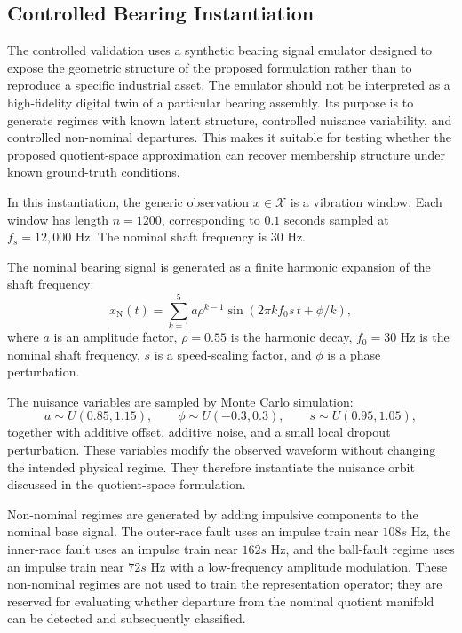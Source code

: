 \documentclass[11pt,letterpaper]{article}
\newcommand{\X}{\ensuremath{\mathcal{X}}}
\begin{document}
\subsection{Controlled Bearing Instantiation}
\label{subsec:bearing_instantiation}
The controlled validation uses a synthetic bearing signal emulator designed to expose the geometric structure of the proposed formulation rather than to reproduce a specific industrial asset.
The emulator should not be interpreted as a high-fidelity digital twin of a particular bearing assembly.
Its purpose is to generate regimes with known latent structure, controlled nuisance variability, and controlled non-nominal departures.
This makes it suitable for testing whether the proposed quotient-space approximation can recover membership structure under known ground-truth conditions.

In this instantiation, the generic observation \(x \in \X\) is a vibration window.
Each window has length \(n=1200\), corresponding to \(0.1\) seconds sampled at \(f_s=12{,}000\) Hz.
The nominal shaft frequency is \(30\) Hz.

The nominal bearing signal is generated as a finite harmonic expansion of the shaft frequency:
\[
x_{\mathrm{N}}(t)
=
\sum_{k=1}^{5}
a \rho^{k-1}
\sin(2\pi k f_0 s\,t + \phi/k),
\]
where \(a\) is an amplitude factor, \(\rho=0.55\) is the harmonic decay, \(f_0=30\) Hz is the nominal shaft frequency, \(s\) is a speed-scaling factor, and \(\phi\) is a phase perturbation.

The nuisance variables are sampled by Monte Carlo simulation:
\[
a \sim U(0.85,1.15), \qquad
\phi \sim U(-0.3,0.3), \qquad
s \sim U(0.95,1.05),
\]
together with additive offset, additive noise, and a small local dropout perturbation.
These variables modify the observed waveform without changing the intended physical regime.
They therefore instantiate the nuisance orbit discussed in the quotient-space formulation.

Non-nominal regimes are generated by adding impulsive components to the nominal base signal.
The outer-race fault uses an impulse train near \(108s\) Hz, the inner-race fault uses an impulse train near \(162s\) Hz, and the ball-fault regime uses an impulse train near \(72s\) Hz with a low-frequency amplitude modulation.
These non-nominal regimes are not used to train the representation operator; they are reserved for evaluating whether departure from the nominal quotient manifold can be detected and subsequently classified.
\end{document}
